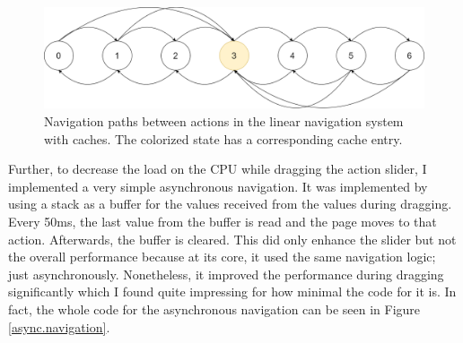 \begin{figure}
\caption{Navigation paths between actions in the linear navigation system with caches. The colorized state has a corresponding cache entry.}
\label{navsystem.cache.overview}
\includegraphics[width=\textwidth]{figures/navigationsystem-cache-overview-2.png}
\end{figure}

Further, to decrease the load on the CPU while dragging the action slider, I implemented a very simple asynchronous navigation. It was implemented by using a stack as a buffer for the values received from the values during dragging. Every 50ms, the last value from the buffer is read and the page moves to that action. Afterwards, the buffer is cleared. This did only enhance the slider but not the overall performance because at its core, it used the same navigation logic; just asynchronously. Nonetheless, it improved the performance during dragging significantly which I found quite impressing for how minimal the code for it is. In fact, the whole code for the asynchronous navigation can be seen in Figure \ref{async.navigation}.

